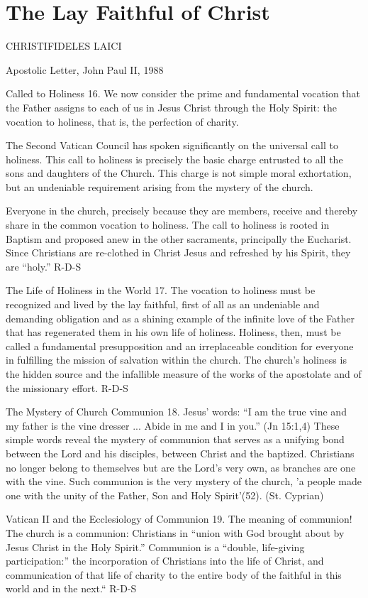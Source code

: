 \documentclass[oneside]{book}
\begin{document}
\chapter{The Lay Faithful of Christ}

CHRISTIFIDELES LAICI

Apostolic Letter, John Paul II, 1988

Called to Holiness
16. We now consider the prime and fundamental vocation that the Father assigns
to each of us in Jesus Christ through the Holy Spirit: the vocation to holiness,
that is, the perfection of charity.

The Second Vatican Council has spoken significantly on the universal call to
holiness. This call to holiness is precisely the basic charge entrusted to all
the sons and daughters of the Church. This charge is not simple moral
exhortation, but an undeniable requirement arising from the mystery of the
church.

Everyone in the church, precisely because they are members, receive and thereby
share in the common vocation to holiness. The call to holiness is rooted in
Baptism and proposed anew in the other sacraments, principally the
Eucharist. Since Christians are re-clothed in Christ Jesus and refreshed by his
Spirit, they are ``holy.''
R-D-S

The Life of Holiness in the World
17. The vocation to holiness must be recognized and lived by the lay faithful,
first of all as an undeniable and demanding obligation and as a shining example
of the infinite love of the Father that has regenerated them in his own life of
holiness. Holiness, then, must be called a fundamental presupposition and an
irreplaceable condition for everyone in fulfilling the mission of salvation
within the church. The church's holiness is the hidden source and the infallible
measure of the works of the apostolate and of the missionary effort.
R-D-S

The Mystery of Church Communion
18. Jesus' words: ``I am the true vine and my father is the vine dresser
... Abide in me and I in you.'' (Jn 15:1,4) These simple words reveal the
mystery of communion that serves as a unifying bond between the Lord and his
disciples, between Christ and the baptized. Christians no longer belong to
themselves but are the Lord's very own, as branches are one with the vine. Such
communion is the very mystery of the church, 'a people made one with the unity
of the Father, Son and Holy Spirit'(52). (St. Cyprian)

Vatican II and the Ecclesiology of Communion
19. The meaning of communion! The church is a communion: Christians in ``union
with God brought about by Jesus Christ in the Holy Spirit.'' Communion is a
``double, life-giving participation:''  the incorporation of Christians into the
life of Christ, and communication of that life of charity to the entire body of
the faithful in this world and in the next.``
R-D-S
\end{document}
